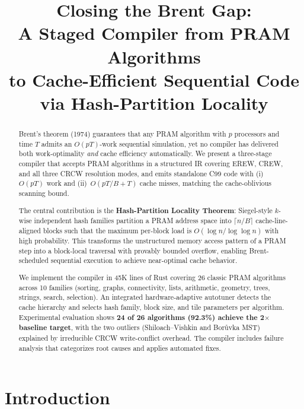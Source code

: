 \documentclass[11pt]{article}
\title{Closing the Brent Gap:\\
A Staged Compiler from PRAM Algorithms\\
to Cache-Efficient Sequential Code\\
via Hash-Partition Locality}
\date{}
\begin{document}
\maketitle

\begin{abstract}
Brent's theorem (1974) guarantees that any PRAM algorithm with $p$
processors and time $T$ admits an $O(pT)$-work sequential simulation, yet
no compiler has delivered both work-optimality \emph{and} cache efficiency
automatically.  We present a three-stage compiler that accepts PRAM
algorithms in a structured IR covering EREW, CREW, and all three CRCW
resolution modes, and emits standalone C99 code with (i)~$O(pT)$ work and
(ii)~$O(pT/B + T)$ cache misses, matching the cache-oblivious scanning
bound.

The central contribution is the \textbf{Hash-Partition Locality Theorem}:
Siegel-style $k$-wise independent hash families partition a PRAM address
space into $\lceil n/B \rceil$ cache-line-aligned blocks such that the
maximum per-block load is $O(\!\log n / \log\log n)$ with high probability.
This transforms the unstructured memory access pattern of a PRAM step into
a block-local traversal with provably bounded overflow, enabling
Brent-scheduled sequential execution to achieve near-optimal cache behavior.

We implement the compiler in 45K lines of Rust covering 26 classic PRAM
algorithms across 10 families (sorting, graphs, connectivity, lists,
arithmetic, geometry, trees, strings, search, selection).  An integrated
hardware-adaptive autotuner detects the cache hierarchy and selects hash
family, block size, and tile parameters per algorithm.  Experimental
evaluation shows \textbf{24 of 26 algorithms (92.3\%) achieve the 2$\times$
baseline target}, with the two outliers (Shiloach--Vishkin and
Bor\r{u}vka MST) explained by irreducible CRCW write-conflict overhead.
The compiler includes failure analysis that categorizes root causes and
applies automated fixes.
\end{abstract}


\section{Introduction}
\label{sec:intro}
\end{document}
